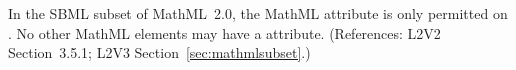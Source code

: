 In the SBML subset of MathML~2.0, the MathML attribute
 is only permitted on 
.  No other
MathML elements may have a  attribute.  (References:
L2V2 Section~3.5.1; L2V3 Section~\ref{sec:mathmlsubset}.)
